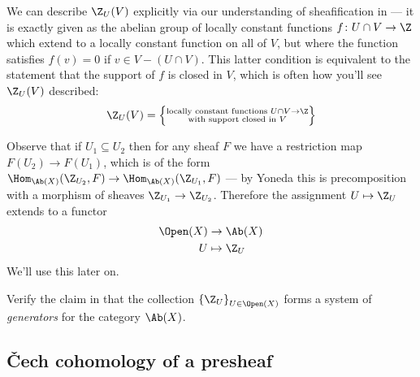 \documentclass[11pt]{amsart}
\begin{document}
\begin{remark} We can describe $\Z_U(V)$ explicitly via our understanding of sheafification in  --- it is exactly given as the abelian group of locally constant functions $f \colon U \cap V \to \Z$ which extend to a locally constant function on all of $V$, but where the function satisfies $f(v) = 0$ if $v\in V \minus (U\cap V)$. This latter condition is equivalent to the statement that the support of $f$ is closed in $V$, which is often how you'll see $\Z_U(V)$ described:
\begin{align*}
    \Z_U(V) = \left\{ \substack{\text{locally constant functions } U\cap V \to \Z\\ \text{with support closed in }V} \right\}
\end{align*}
\end{remark}

Observe that if $U_1 \subseteq U_2$ then for any sheaf $F$ we have a restriction map $F(U_2) \to F(U_1)$, which is of the form $\Hom_{\Ab(X)}(\Z_{U_2},F) \to \Hom_{\Ab(X)}(\Z_{U_1},F)$ --- by Yoneda this is precomposition with a morphism of sheaves $\Z_{U_1}\to \Z_{U_2}$. Therefore the assignment $U\mapsto \Z_U$ extends to a functor
\begin{equation}\label{eqn:U-to-ZU-functor}
\begin{aligned}
    \Open(X) &\to \Ab(X) \\
    U &\mapsto \Z_U
\end{aligned}
\end{equation}
We'll use this later on.


\begin{exercise} Verify the claim in \cite[1.9.2]{Tohoku} that the collection $\left\{ \Z_U \right\}_{U\in \Open(X)}$ forms a system of \emph{generators} for the category $\Ab(X)$.
\end{exercise}

\subsection{\v{C}ech cohomology of a presheaf}
\end{document}
